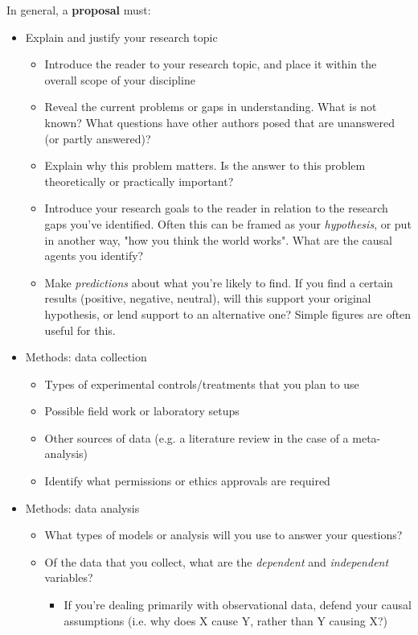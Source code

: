 \documentclass[11pt]{article}
\begin{document}
In general, a \textbf{proposal} must:
\begin{itemize}
  \item Explain and justify your research topic
  \begin{itemize}
    \item Introduce the reader to your research topic, and place it within the overall scope of your discipline
    \item Reveal the current problems or gaps in understanding. What is not known? What questions have other authors posed that are unanswered (or partly answered)?
    \item Explain why this problem matters. Is the answer to this problem theoretically or practically important? 
    \item Introduce your research goals to the reader in relation to the research gaps you've identified. Often this can be framed as your \emph{hypothesis}, or put in another way, "how you think the world works". What are the causal agents you identify?
    \item Make \emph{predictions} about what you're likely to find. If you find a certain results (positive, negative, neutral), will this support your original hypothesis, or lend support to an alternative one? Simple figures are often useful for this.
  \end{itemize}
  \item Methods: data collection
  \begin{itemize}
    \item Types of experimental controls/treatments that you plan to use
    \item Possible field work or laboratory setups
    \item Other sources of data (e.g. a literature review in the case of a meta-analysis)
    \item Identify what permissions or ethics approvals are required
  \end{itemize}
  \item Methods: data analysis
  \begin{itemize}
    \item What types of models or analysis will you use to answer your questions?
    \item Of the data that you collect, what are the \emph{dependent} and \emph{independent} variables?
    \begin{itemize} 
      \item If you're dealing primarily with observational data, defend your causal assumptions (i.e. why does X cause Y, rather than Y causing X?)

\end{itemize}
\end{itemize}
\end{itemize}
\end{document}
